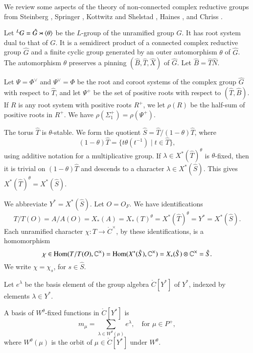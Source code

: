 We review some aspects of the theory of non-connected complex
reductive groups from Steinberg \cite{steinberg1968endomorphisms},
Springer \cite{springer2010linear}, Kottwitz and Shelstad
\cite{kottwitz1999foundations}, Haines \cite{haines2016dualities}, and
Chriss \cite{chriss}.

Let ${}^LG = \hat G \rtimes \langle{\theta}\rangle$ be the $L$-group of the
unramified group $G$.  It has root system dual to that of $G$.  It is
a semidirect product of a connected complex reductive group $\hat G$
and a finite cyclic group generated by an outer automorphism $\theta$
of $\hat G$.  The automorphism $\theta$ preserves a pinning $(\hat
B,\hat T,\hat X)$ of $\hat G$. Let $\hat B = \hat T\hat N$.

Let $\Psi=\Phi^\vee$ and $\Psi^\vee=\Phi$ be the root and coroot
systems of the complex group $\hat G$ with respect to $\hat T$, and
let $\Psi^+$ be the set of positive roots with respect to $(\hat
T,\hat B)$.  If $R$ is any root system with positive roots $R^+$, we
let $\rho(R)$ be the half-sum of positive roots in $R^+$.  We have
$\rho(\Sigma^+_1) = \rho(\Psi^+)$.

The torus $\hat T$ is $\theta$-stable.  We form the quotient $\hat S =
\hat T/(1-\theta) \hat T$, where
\[
(1-\theta)\hat T = \{ t\theta(t^{-1}) \mid t\in \hat T\},
\]
using additive notation for a multiplicative group.  If $\lambda\in
X^*(\hat T)^\theta$ is $\theta$-fixed, then it is trivial on
$(1-\theta)\hat T$ and descends to a character $\lambda\in X^*(\hat
S)$.  This gives $X^*(\hat T)^\theta = X^*(\hat S)$.

We abbreviate $Y^* = X^*(\hat S)$. Let $O=O_F$.  We have
identifications
\begin{equation}\label{eqn:identify}
T/T(O)=A/A(O)=X_*(A)=X_*(T)^\theta  =X^*(\hat T)^\theta = Y^* = X^*(\hat S).
\end{equation}
Each unramified character $\chi:T\to \ring{C}^\times$, by these
identifications, is a homomorphism
\begin{equation}
\chi\in{\operatorname{Hom}}(T/T(O),\mathbb{C}^\times) = 
{\operatorname{Hom}}(X^*(\hat S),\mathbb{C}^\times) = 
X_*(\hat S)\otimes \mathbb{C}^\times = \hat S.
\end{equation}
We write $\chi = \chi_s$, for $s\in\hat S$.

Let $e^\lambda$ be the basis element of the group algebra
$\ring{C}[Y^*]$ of $Y^*$, indexed by elements $\lambda\in Y^*$.

A basis of $W^\theta$-fixed functions in $\ring{C}[Y^*]$ is
\[
m_\mu = \sum_{\lambda\in W^\theta(\mu)} e^\lambda, 
\quad \text{for }\mu\in P^+,
\]
where $W^\theta(\mu)$ is the orbit of $\mu\in\ring{C}[Y^*]$ under
$W^\theta$.

